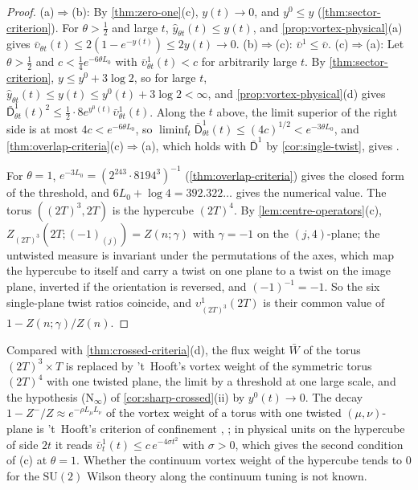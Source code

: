 \documentclass[11pt,a4paper]{amsart}
\theoremstyle{definition}
\theoremstyle{remark}
\numberwithin{equation}{section}
\newcommand{\SU}{\mathrm{SU}}              %
\newcommand{\cube}[1]{(2#1)^3}             %
\newcommand{\Mcirc}{\text{\upshape(M$^{\circ}$)}}   %
\begin{document}
\begin{proof}
(a)$\Rightarrow$(b): By \cref{thm:zero-one}\textup{(c)}, $y(t)\to0$, and $y^0\le y$ (\cref{thm:sector-criterion}). For $\theta>\frac12$ and large $t$, $\hat y_{\theta t}(t)\le y(t)$, and \cref{prop:vortex-physical}\textup{(a)} gives $\bar\upsilon_{\theta t}(t)\le2(1-e^{-y(t)})\le2y(t)\to0$. (b)$\Rightarrow$(c): $\bar\upsilon^1\le\bar\upsilon$. (c)$\Rightarrow$(a): Let $\theta>\frac12$ and $c<\frac14e^{-6\theta L_0}$ with $\bar\upsilon^1_{\theta t}(t)<c$ for arbitrarily large $t$. By \cref{thm:sector-criterion}, $y\le y^0+3\log2$, so for large $t$, $\hat y_{\theta t}(t)\le y(t)\le y^0(t)+3\log2<\infty$, and \cref{prop:vortex-physical}\textup{(d)} gives $\bar{\mathsf D}^1_{\theta t}(t)^2\le\frac12\cdot8e^{y^0(t)}\bar\upsilon^1_{\theta t}(t)$. Along the $t$ above, the limit superior of the right side is at most $4c<e^{-6\theta L_0}$, so $\liminf_t\bar{\mathsf D}^1_{\theta t}(t)\le(4c)^{1/2}<e^{-3\theta L_0}$, and \cref{thm:overlap-criteria}\textup{(c)}$\Rightarrow$\textup{(a)}, which holds with $\bar{\mathsf D}^1$ by \cref{cor:single-twist}, gives \Mcirc{}.

For $\theta=1$, $e^{-3L_0}=(2^{243}\cdot8194^3)^{-1}$ (\cref{thm:overlap-criteria}) gives the closed form of the threshold, and $6L_0+\log4=392.322\ldots$ gives the numerical value. The torus $(\cube T,2T)$ is the hypercube $(2T)^4$. By \cref{lem:centre-operators}\textup{(c)}, $Z_{\cube T}(2T;(-1)_{(j)})=Z(n;\gamma)$ with $\gamma=-1$ on the $(j,4)$-plane; the untwisted measure is invariant under the permutations of the axes, which map the hypercube to itself and carry a twist on one plane to a twist on the image plane, inverted if the orientation is reversed, and $(-1)^{-1}=-1$. So the six single-plane twist ratios coincide, and $\upsilon^1_{\cube T}(2T)$ is their common value of $1-Z(n;\gamma)/Z(n)$.
\end{proof}

Compared with \cref{thm:crossed-criteria}\textup{(d)}, the flux weight $\bar W$ of the torus $\cube T\times T$ is replaced by 't~Hooft's vortex weight of the symmetric torus $(2T)^4$ with one twisted plane, the limit by a threshold at one large scale, and the hypothesis \textup{(N$_\infty$)} of \cref{cor:sharp-crossed}\textup{(ii)} by $y^0(t)\to0$. The decay $1-Z^-/Z\approx e^{-\rho L_\mu L_\nu}$ of the vortex weight of a torus with one twisted $(\mu,\nu)$-plane is 't~Hooft's criterion of confinement \cite{thooft1979}, \cite[Section~2.1]{kanazawa2009}; in physical units on the hypercube of side $2t$ it reads $\bar\upsilon^1_t(t)\le c\,e^{-4\sigma t^2}$ with $\sigma>0$, which gives the second condition of \textup{(c)} at $\theta=1$. Whether the continuum vortex weight of the hypercube tends to $0$ for the $\SU(2)$ Wilson theory along the continuum tuning is not known.
\end{document}
